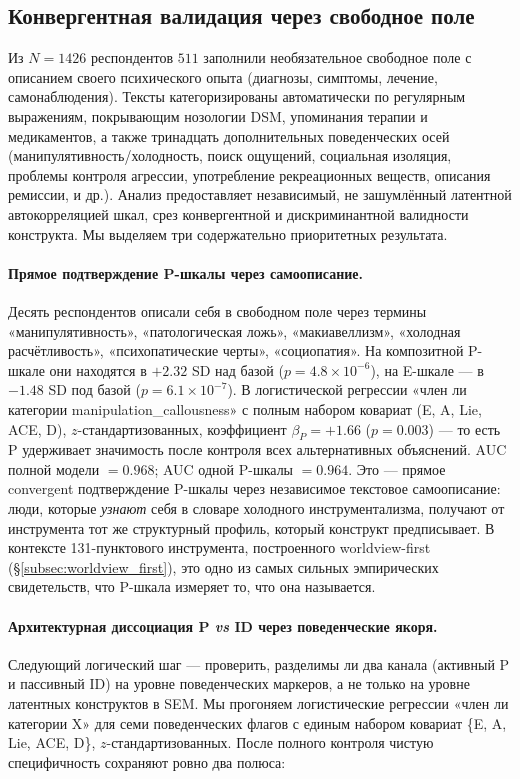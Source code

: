 \subsection{Конвергентная валидация через свободное поле}
\label{subsec:free_text_convergent}

Из $N = 1426$ респондентов $511$ заполнили необязательное свободное поле с описанием своего психического опыта (диагнозы, симптомы, лечение, самонаблюдения). Тексты категоризированы автоматически по регулярным выражениям, покрывающим нозологии DSM, упоминания терапии и медикаментов, а также тринадцать дополнительных поведенческих осей (манипулятивность/холодность, поиск ощущений, социальная изоляция, проблемы контроля агрессии, употребление рекреационных веществ, описания ремиссии, и др.). Анализ предоставляет независимый, не зашумлённый латентной автокорреляцией шкал, срез конвергентной и дискриминантной валидности конструкта. Мы выделяем три содержательно приоритетных результата.

\paragraph{Прямое подтверждение P-шкалы через самоописание.} Десять респондентов описали себя в свободном поле через термины «манипулятивность», «патологическая ложь», «макиавеллизм», «холодная расчётливость», «психопатические черты», «социопатия». На композитной P-шкале они находятся в $+2.32$ SD над базой ($p = 4.8 \times 10^{-6}$), на E-шкале --- в $-1.48$ SD под базой ($p = 6.1 \times 10^{-7}$). В логистической регрессии «член ли категории manipulation\_callousness» с полным набором ковариат (E, A, Lie, ACE, D), $z$-стандартизованных, коэффициент $\beta_P = +1.66$ ($p = 0.003$) --- то есть P удерживает значимость после контроля всех альтернативных объяснений. AUC полной модели $= 0.968$; AUC одной P-шкалы $= 0.964$. Это --- прямое convergent подтверждение P-шкалы через независимое текстовое самоописание: люди, которые \emph{узнают} себя в словаре холодного инструментализма, получают от инструмента тот же структурный профиль, который конструкт предписывает. В контексте 131-пунктового инструмента, построенного worldview-first (§\ref{subsec:worldview_first}), это одно из самых сильных эмпирических свидетельств, что P-шкала измеряет то, что она называется.

\paragraph{Архитектурная диссоциация P \emph{vs} ID через поведенческие якоря.} Следующий логический шаг --- проверить, разделимы ли два канала (активный P и пассивный ID) на уровне поведенческих маркеров, а не только на уровне латентных конструктов в SEM. Мы прогоняем логистические регрессии «член ли категории X» для семи поведенческих флагов с единым набором ковариат \{E, A, Lie, ACE, D\}, $z$-стандартизованных. После полного контроля чистую специфичность сохраняют ровно два полюса:

